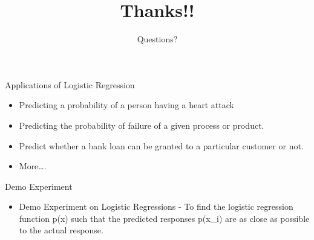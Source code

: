 \documentclass[aspectratio=169,14pt,usenames,dvipsnames]{beamer}
\begin{document}
\begin{frame}{Applications of Logistic Regression}
\begin{itemize}
\item Predicting a probability of a person having a heart attack
\item Predicting the probability of failure of a given process or product.
\item Predict whether a bank loan can be granted to a particular customer or not.
\item More….
\end{itemize}
\end{frame}

\begin{frame}{Demo Experiment}
\begin{itemize}
\item Demo Experiment on Logistic Regressions
- To find the logistic regression function p(x) such that the predicted responses p(x\_i) are as close as possible to the actual response.
\end{itemize}
\end{frame}

{ \1
\begin{frame}
	\title{Thanks!!}
	\subtitle{Questions?}
	\maketitle
\end{frame}
}
\end{document}
